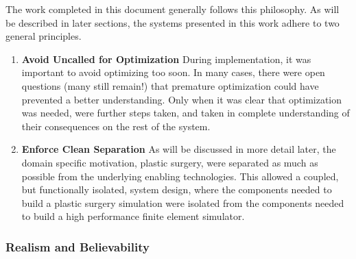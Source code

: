 \documentclass[12pt,oneside,letterpaper]{memoir}
\begin{document}
The work completed in this document generally follows this
philosophy. As will be described in later sections, the systems
presented in this work adhere to two general principles.

\begin{enumerate}
\item \textbf{Avoid Uncalled for Optimization} During implementation,
  it was important to avoid optimizing too soon. In many cases, there
  were open questions (many still remain!) that premature optimization
  could have prevented a better understanding. Only when it was clear
  that optimization was needed, were further steps taken, and taken in
  complete understanding of their consequences on the rest of the
  system.

\item \textbf{Enforce Clean Separation} As will be discussed in more
  detail later, the domain specific motivation, plastic surgery, were
  separated as much as possible from the underlying enabling
  technologies. This allowed a coupled, but functionally isolated,
  system design, where the components needed to build a plastic
  surgery simulation were isolated from the components needed to build
  a high performance finite element simulator.
  
\end{enumerate}


\subsubsection{Realism and Believability}
\end{document}
